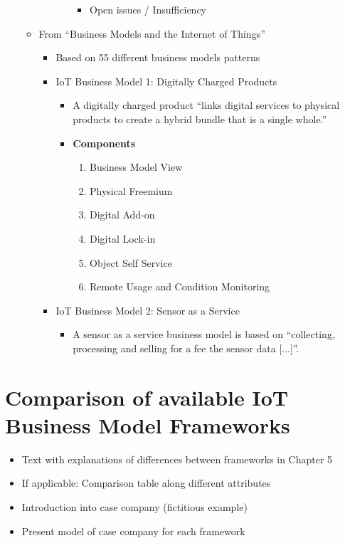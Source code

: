 \begin{itemize}
\begin{itemize}
\begin{itemize}
\begin{enumerate}[I]
\begin{itemize}
										\item Open issues / Insufficiency
									\end{itemize}		
							\end{enumerate}
					\end{itemize}
				\item From ``Business Models and the Internet of Things'' \cite{fleisch}
					\begin{itemize}
						\item Based on 55 different business models patterns \cite{gassmann}
						\item IoT Business Model 1: Digitally Charged Products
							\begin{itemize}
								\item A digitally charged product ``links digital services to physical products to create a hybrid bundle that is a single whole.''
								\item \textbf{Components}
									\begin{enumerate}[a]
										\item Business Model View
										\item Physical Freemium
										\item Digital Add-on
										\item Digital Lock-in
										\item Object Self Service
										\item Remote Usage and Condition Monitoring
									\end{enumerate}
							\end{itemize}
						\item IoT Business Model 2: Sensor as a Service
							\begin{itemize}
								\item A sensor as a service business model is based on ``collecting, processing and selling for a fee the sensor data [...]''.
							\end{itemize}
					\end{itemize}
			\end{itemize}
	\end{itemize}

\section{Comparison of available IoT Business Model Frameworks}
	\begin{itemize}
		\item Text with explanations of differences between frameworks in Chapter 5
		\item If applicable: Comparison table along different attributes
		\item Introduction into case company (fictitious example)
		\item Present model of case company for each framework
	\end{itemize}


